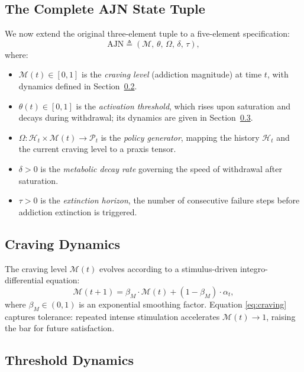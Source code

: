 \documentclass[12pt,a4paper]{article}
\begin{document}
\subsection{The Complete AJN State Tuple}
\label{sec:state_tuple}

We now extend the original three-element tuple to a five-element specification:
\[
\text{AJN} \triangleq \left(\mathcal{M},\, \theta,\, \Omega,\, \delta,\, \tau\right),
\]
where:
\begin{itemize}
    \item $\mathcal{M}(t) \in [0,1]$ is the \textit{craving level} (addiction
    magnitude) at time $t$, with dynamics defined in Section~\ref{sec:craving}.
    \item $\theta(t) \in [0,1]$ is the \textit{activation threshold}, which rises
    upon saturation and decays during withdrawal; its dynamics are given in
    Section~\ref{sec:threshold}.
    \item $\Omega: \mathcal{H}_t \times \mathcal{M}(t) \to \mathcal{P}_t$ is the
    \textit{policy generator}, mapping the history $\mathcal{H}_t$ and the current
    craving level to a praxis tensor.
    \item $\delta > 0$ is the \textit{metabolic decay rate} governing the speed of
    withdrawal after saturation.
    \item $\tau > 0$ is the \textit{extinction horizon}, the number of consecutive
    failure steps before addiction extinction is triggered.
\end{itemize}

\subsection{Craving Dynamics}
\label{sec:craving}

The craving level $\mathcal{M}(t)$ evolves according to a stimulus-driven
integro-differential equation:
\begin{equation}
\mathcal{M}(t+1) = \beta_M \cdot \mathcal{M}(t) + (1 - \beta_M) \cdot \alpha_t,
\label{eq:craving}
\end{equation}
where $\beta_M \in (0,1)$ is an exponential smoothing factor. Equation
\eqref{eq:craving} captures tolerance: repeated intense stimulation accelerates
$\mathcal{M}(t) \to 1$, raising the bar for future satisfaction.

\subsection{Threshold Dynamics}
\label{sec:threshold}
\end{document}
